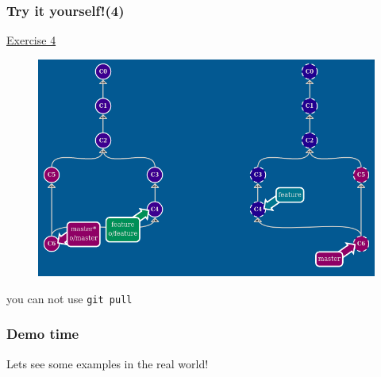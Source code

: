 \documentclass{beamer}
\begin{document}
\begin{frame}
    \frametitle{Try it yourself!(4)}
    \begin{center}
        \href{https://learngitbranching.js.org/?NODEMO\&command=git\%20commit;git\%20checkout\%20-b\%20feature;git\%20clone;git\%20fakeTeamwork\%20feature;git\%20fakeTeamwork\%20feature;git\%20checkout\%20master;git\%20commit}{Exercise 4}
    \end{center}
    \begin{figure}
        \includegraphics[scale=0.3]{imgs/ex4.png}
    \end{figure}
    \begin{center}
        you can not use \texttt{git pull}
    \end{center}
\end{frame}


\begin{frame}
    \frametitle{Demo time}
    Lets see some examples in the real world!
\end{frame}
\end{document}
